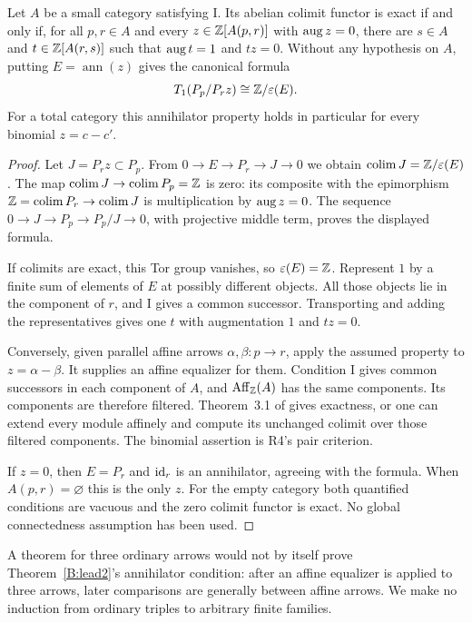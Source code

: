 \begin{theorem}\label{B:lead2}
Let $A$ be a small category satisfying I. Its abelian colimit functor is exact if and only if, for all $p,r\in A$ and every $z\in\mathbb Z[A(p,r)]$ with $\operatorname{aug} z=0$, there are $s\in A$ and $t\in\mathbb Z[A(r,s)]$ such that $\operatorname{aug} t=1$ and $tz=0$. Without any hypothesis on $A$, putting $E=\operatorname{ann}(z)$ gives the canonical formula
\[
 T_1(P_p/P_rz)\cong\mathbb Z/\varepsilon(E).
\]
For a total category this annihilator property holds in particular for every binomial $z=c-c'$.
\end{theorem}
\begin{proof}
Let $J=P_rz\subset P_p$. From
$0\to E\to P_r\to J\to0$ we obtain
$\operatorname*{colim} J=\mathbb Z/\varepsilon(E)$. The map $\operatorname*{colim} J\to\operatorname*{colim} P_p=\mathbb Z$ is zero: its composite with the epimorphism $\mathbb Z=\operatorname*{colim} P_r\to\operatorname*{colim} J$ is multiplication by $\operatorname{aug} z=0$. The sequence $0\to J\to P_p\to P_p/J\to0$, with projective middle term, proves the displayed formula.

If colimits are exact, this Tor group vanishes, so $\varepsilon(E)=\mathbb Z$. Represent $1$ by a finite sum of elements of $E$ at possibly different objects. All those objects lie in the component of $r$, and I gives a common successor. Transporting and adding the representatives gives one $t$ with augmentation $1$ and $tz=0$.

Conversely, given parallel affine arrows $\alpha,\beta:p\to r$, apply the assumed property to $z=\alpha-\beta$. It supplies an affine equalizer for them. Condition I gives common successors in each component of $A$, and $\operatorname{Aff}_\mathbb Z(A)$ has the same components. Its components are therefore filtered. Theorem~3.1 of \citet{IsbellMitchell1976} gives exactness, or one can extend every module affinely and compute its unchanged colimit over those filtered components. The binomial assertion is R4's pair criterion.

If $z=0$, then $E=P_r$ and $\operatorname{id}_r$ is an annihilator, agreeing with the formula. When $A(p,r)=\varnothing$ this is the only $z$. For the empty category both quantified conditions are vacuous and the zero colimit functor is exact. No global connectedness assumption has been used.
\end{proof}

A theorem for three ordinary arrows would not by itself prove Theorem~\ref{B:lead2}'s annihilator condition: after an affine equalizer is applied to three arrows, later comparisons are generally between affine arrows. We make no induction from ordinary triples to arbitrary finite families.

